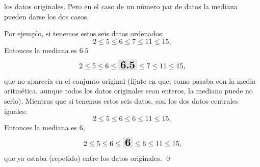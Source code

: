 los datos originales. Pero en el caso de un número par de datos la mediana
pueden darse los dos casos.
\begin{ejemplo}
\label{cap02:ejem:CalculoMediana}
Por ejemplo, si tenemos estos seis datos ordenados:
        \[
        2\leq 5\leq 6\leq 7\leq 11\leq 15,
        \]
Entonces la mediana es $6.5$
        \[
        2\leq 5\leq 6\leq\colorbox{lightgrey}{\mbox{\Large\bf 6.5}}\leq 7\leq 11\leq 15,
        \]
que no aparecía en el conjunto original (fíjate en que, como pasaba con la
media aritmética, aunque todos los datos originales sean enteros, la mediana
puede no serlo). Mientras que si tenemos estos seis datos, con los dos datos
centrales iguales:
        \[
        2\leq 5\leq 6\leq 6\leq 11\leq 15,
        \]
Entonces la mediana es $6$,
        \[
        2\leq 5\leq 6\leq\colorbox{lightgrey}{\mbox{\Large\bf 6}}\leq 6\leq 11\leq 15,
        \]
que ya estaba (repetido) entre los datos originales.
\qed
\end{ejemplo}


